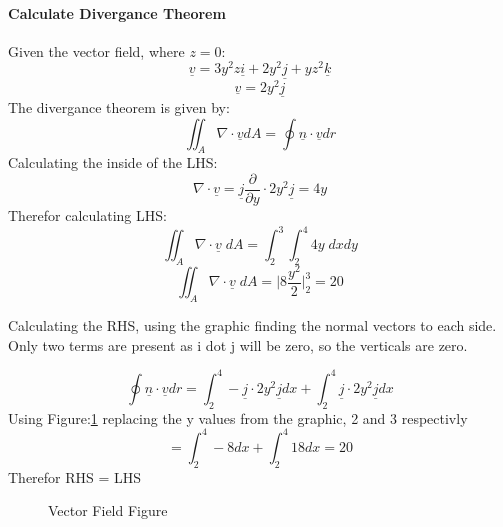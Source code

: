 \documentclass[../main.tex]{subfiles}
\newcommand{\un}[1]{\underline{#1}}
\newcommand{\partFrac}[2]{\frac{\partial #1}{\partial #2}}
\begin{document}
	\paragraph{Calculate Divergance Theorem}
		Given the vector field, where $z=0$:
		\begin{equation}
			\underline{v}=3y^{2}z\underline{i} + 2y^{2}\underline{j} + yz^{2}\underline{k}
		\end{equation}
		\begin{equation}
			\underline{v} = 2y^{2}\underline{j}
		\end{equation}
		The divergance theorem is given by:
		\begin{equation*}
			\iint_A \nabla \cdot \underline{v} dA  = \oint \underline{n} \cdot \underline{v} dr
		\end{equation*}
		Calculating the inside of the LHS:
		\begin{equation*}
			\nabla \cdot \un{v} = \un{j} \partFrac{}{y} \cdot 2y^{2} \un{j} = 4y
		\end{equation*}
		Therefor calculating LHS:
		\begin{equation*}
			\iint_A \nabla \cdot \underline{v} \; dA  = \int_{2}^{3} \int_2^4 4y \;dxdy
		\end{equation*}
		\begin{equation*}
			\iint_A \nabla \cdot \underline{v} \; dA  = \Big| 8 \frac{y^2}{2} \Big|_2^3 = 20
		\end{equation*}

		Calculating the RHS, using the graphic finding the normal vectors to each side. Only two terms
		are present as i dot j will be zero, so the verticals are zero.

		\begin{equation*}
			\oint \underline{n} \cdot \underline{v} dr = \int_2^4 -\un{j} \cdot 2y^2\un{j} dx + \int_2^4 \un{j} \cdot 2y^2\un{j} dx 
		\end{equation*}
		Using Figure:\ref{fg:1} replacing the y values from the graphic, 2 and 3 respectivly
		\begin{equation*}
			= \int_2^4 -8 dx + \int_2^4 18 dx = 20
		\end{equation*}
		Therefor RHS = LHS
		\begin{figure}[ht]
			\centering
			\caption{Vector Field Figure}
			\label{fg:1}
		\end{figure}
\end{document}
